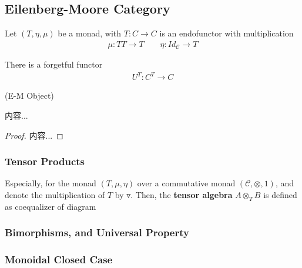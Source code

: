\documentclass[Total.tex]{subfiles}
\begin{document}
			\subsection{Eilenberg-Moore Category}
			\begin{Def}
				Let $(T,\eta,\mu)$ be a monad, with $T:C\rightarrow C$ is an endofunctor with multiplication
				\begin{gather*}
					\mu:TT\rightarrow T\qquad \eta:Id_\mathcal{C}\rightarrow T
				\end{gather*}
				
				There is a forgetful functor
				\begin{gather*}
					U^T:C^T\rightarrow C
				\end{gather*}
			\end{Def}
			
			\begin{Def}
				(E-M Object)
			\end{Def}
			
			\begin{proposition}
				内容...
			\end{proposition}
			\begin{proof}
				内容...
			\end{proof}
			\subsubsection{Tensor Products}
			
			\begin{Def}
				Especially, for the monad $(T,\mu,\eta)$ over a commutative monad $(\mathcal{C},\otimes,1)$, and denote the multiplication of $T$ by $\triangledown$. Then, the \textbf{tensor algebra} $A\otimes_T B$ is defined as coequalizer of diagram
				\begin{center}
				\end{center}
			\end{Def}
			
			\subsubsection{Bimorphisms, and Universal Property}
			\subsubsection{Monoidal Closed Case}
\end{document}
